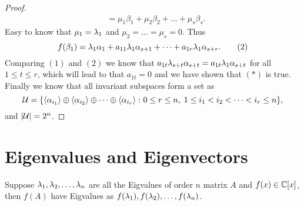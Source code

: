 \begin{proof}
\begin{align*}
			  &=\mu_1\beta_1+\mu_2\beta_2+\dots+\mu_s\beta_s.\tag{1}
	\end{align*}
	Easy to know that $\mu_1=\lambda_1$ and $\mu_2=\dots=\mu_s=0$. Thus 
	\[f(\beta_1)=\lambda_1\alpha_1+a_{11}\lambda_1 \alpha_{s+1}+\dots+a_{1r}\lambda_1 \alpha_{s+r}.\tag{2}\]
	Comparing $(1)$ and $(2)$ we know that $a_{1t} \lambda_{s+t} \alpha_{s+t}=a_{1t}\lambda_1 \alpha_{s+t}$ for all $1\leq t\leq r$, which will lead to that $a_{1t}=0$ and we have shown that $(*)$ is true. Finally we know that all invariant subspaces form a set as
	\[\mathcal{U}=\{\left\langle \alpha_{i_1}\right\rangle\oplus\left\langle \alpha_{i_2}\right\rangle\oplus\dots\oplus\left\langle \alpha_{i_r}\right\rangle\colon 0\leq r\leq n,\;1\leq i_1<i_2
	<\dots <i_r\leq n\},\]
	and $|\mathcal{U}|=2^n$.
\end{proof}

\section{Eigenvalues and Eigenvectors}

\begin{pro}%
	Suppose $\lambda_1,\lambda_2,\dots,\lambda_n$ are all the Eigvalues of order $n$ matrix $A$ and $f(x)\in \mathbb{C}[x]$, then $f(A)$ have Eigvalues as $f(\lambda_1),f(\lambda_2),\dots,f(\lambda_n)$.
\end{pro}

